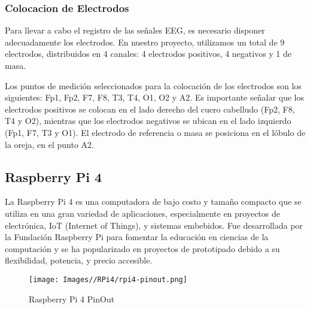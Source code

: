 \documentclass{article}
\begin{document}
\subsubsection{Colocacion de Electrodos}
Para llevar a cabo el registro de las señales EEG, es necesario disponer adecuadamente los electrodos. En nuestro proyecto, utilizamos un total de 9 electrodos, distribuidos en 4 canales: 4 electrodos positivos, 4 negativos y 1 de masa.

Los puntos de medición seleccionados para la colocación de los electrodos son los siguientes: Fp1, Fp2, F7, F8, T3, T4, O1, O2 y A2. Es importante señalar que los electrodos positivos se colocan en el lado derecho del cuero cabelludo (Fp2, F8, T4 y O2), mientras que los electrodos negativos se ubican en el lado izquierdo (Fp1, F7, T3 y O1). El electrodo de referencia o masa se posiciona en el lóbulo de la oreja, en el punto A2.

\subsection{Raspberry Pi 4}
La Raspberry Pi 4 es una computadora de bajo costo y tamaño compacto que se utiliza en una gran variedad de aplicaciones, especialmente en proyectos de electrónica, IoT (Internet of Things), y sistemas embebidos. Fue desarrollada por la Fundación Raspberry Pi para fomentar la educación en ciencias de la computación y se ha popularizado en proyectos de prototipado debido a su flexibilidad, potencia, y precio accesible.
\begin{figure}[H]
    \centering
    \texttt{[image: Images//RPi4/rpi4-pinout.png]}
    \caption{Raspberry Pi 4 PinOut}
    \label{fig:enter-label}
\end{figure}
\end{document}

